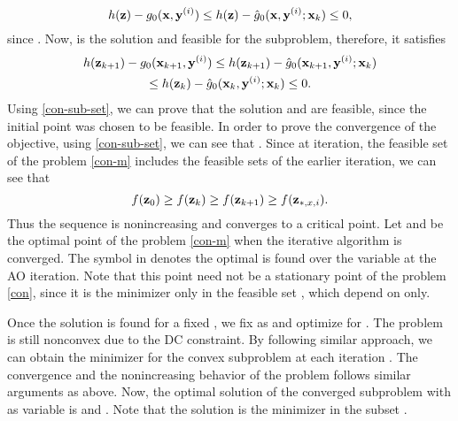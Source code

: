 \begin{equation}
h(\mathbf{z}) - {g}_0(\mathbf{x},{{{\mathbf{y}}}}^{(i)}) \leq h(\mathbf{z}) - \hat{g}_0(\mathbf{x},{{{\mathbf{y}}}}^{(i)};{{\mathbf{x}}}_k) \leq 0,
\end{equation}
since . Now,  is the solution and feasible for the  subproblem, therefore, it satisfies
\begin{multline}
h(\mz_{k+1}) - {g}_0(\mx_{k+1},\iterate{\myb}{i}) \leq h(\mz_{k+1}) - \hat{g}_0(\mx_{k+1},\iterate{\myb}{i};\mxb_k) \\
\leq h(\mz_{k}) - \hat{g}_0(\mx_{k},\iterate{\myb}{i};\mxb_k) \leq 0. \label{con-sub-set}
\end{multline}
Using \eqref{con-sub-set}, we can prove that the solution  and  are feasible, since the initial point  was chosen to be feasible. In order to prove the convergence of the objective, using \eqref{con-sub-set}, we can see that . Since at  iteration, the feasible set of the problem \eqref{con-m} includes the feasible sets of the earlier iteration, we can see that 
\begin{equation} \label{con-convergence}
f(\mz_0) \geq f(\mz_k) \geq f(\mz_{k+1}) \geq f(\mz_{\ast,x,i}). 
\end{equation}
Thus the sequence  is nonincreasing and converges to a critical point. Let \me{\mx_{\ast}} and  be the optimal point of the problem \eqref{con-m} when the iterative algorithm is converged. The symbol  in  denotes the optimal \me{\mz} is found over the variable \me{\mx} at the  \ac{AO} iteration. Note that this point need not be a stationary point of the problem \eqref{con}, since it is the minimizer only in the feasible set , which depend on \me{\mx} only.

Once the solution is found for a fixed \me{\my}, we fix \me{\mx} as  and optimize for \me{\my}. The problem is still nonconvex due to the \ac{DC} constraint. By following similar approach, we can obtain the minimizer  for the convex subproblem at each iteration . The convergence and the nonincreasing behavior of the problem follows similar arguments as above. Now, the optimal solution of the converged subproblem with \me{\my} as variable is \me{\my_{\ast}} and . Note that the solution  is the minimizer in the subset .

